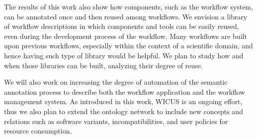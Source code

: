 The results of this work also show how components, such as the workflow system, can be annotated once and then reused among workflows. We envision a library of workflow descriptions in which components and tools can be easily reused, even during the development process of the workflow. Many workflows are built upon previous workflows, especially within the context of a scientific domain, and hence having such type of library would be helpful. We plan to study how and when those libraries can be built, analyzing their degree of reuse. 

  We will also work on increasing  the degree of automation of the semantic annotation process to describe both the workflow application and the workflow management system. As introduced in this work, WICUS is an ongoing effort, thus we also plan to extend the ontology network to include new concepts and relations such as software variants, incompatibilities, and user policies for resource consumption.